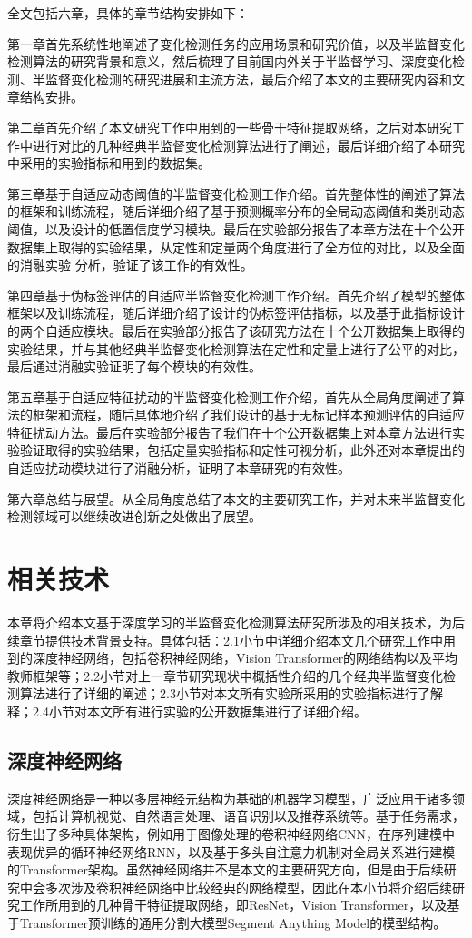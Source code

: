 \documentclass[lang=chs, degree=master, blindreview=false, adobe=false]{yanputhesis}
\begin{document}
全文包括六章，具体的章节结构安排如下：

第一章首先系统性地阐述了变化检测任务的应用场景和研究价值，以及半监督变化检测算法的研究背景和意义，然后梳理了目前国内外关于半监督学习、深度变化检测、半监督变化检测的研究进展和主流方法，最后介绍了本文的主要研究内容和文章结构安排。

第二章首先介绍了本文研究工作中用到的一些骨干特征提取网络，之后对本研究工作中进行对比的几种经典半监督变化检测算法进行了阐述，最后详细介绍了本研究中采用的实验指标和用到的数据集。

第三章基于自适应动态阈值的半监督变化检测工作介绍。首先整体性的阐述了算法的框架和训练流程，随后详细介绍了基于预测概率分布的全局动态阈值和类别动态阈值，以及设计的低置信度学习模块。最后在实验部分报告了本章方法在十个公开数据集上取得的实验结果，从定性和定量两个角度进行了全方位的对比，以及全面的消融实验
分析，验证了该工作的有效性。

第四章基于伪标签评估的自适应半监督变化检测工作介绍。首先介绍了模型的整体框架以及训练流程，随后详细介绍了设计的伪标签评估指标，以及基于此指标设计的两个自适应模块。最后在实验部分报告了该研究方法在十个公开数据集上取得的实验结果，并与其他经典半监督变化检测算法在定性和定量上进行了公平的对比，最后通过消融实验证明了每个模块的有效性。

第五章基于自适应特征扰动的半监督变化检测工作介绍，首先从全局角度阐述了算法的框架和流程，随后具体地介绍了我们设计的基于无标记样本预测评估的自适应特征扰动方法。最后在实验部分报告了我们在十个公开数据集上对本章方法进行实验验证取得的实验结果，包括定量实验指标和定性可视分析，此外还对本章提出的自适应扰动模块进行了消融分析，证明了本章研究的有效性。

第六章总结与展望。从全局角度总结了本文的主要研究工作，并对未来半监督变化检测领域可以继续改进创新之处做出了展望。
\chapter{相关技术}

本章将介绍本文基于深度学习的半监督变化检测算法研究所涉及的相关技术，为后续章节提供技术背景支持。具体包括：2.1小节中详细介绍本文几个研究工作中用到的深度神经网络，包括卷积神经网络，Vision Transformer的网络结构以及平均教师框架等；2.2小节对上一章节研究现状中概括性介绍的几个经典半监督变化检测算法进行了详细的阐述；2.3小节对本文所有实验所采用的实验指标进行了解释；2.4小节对本文所有进行实验的公开数据集进行了详细介绍。

\section{深度神经网络}
深度神经网络是一种以多层神经元结构为基础的机器学习模型，广泛应用于诸多领域，包括计算机视觉、自然语言处理、语音识别以及推荐系统等。基于任务需求，衍生出了多种具体架构，例如用于图像处理的卷积神经网络CNN，在序列建模中表现优异的循环神经网络RNN，以及基于多头自注意力机制对全局关系进行建模的Transformer架构。虽然神经网络并不是本文的主要研究方向，但是由于后续研究中会多次涉及卷积神经网络中比较经典的网络模型，因此在本小节将介绍后续研究工作所用到的几种骨干特征提取网络，即ResNet，Vision Transformer，以及基于Transformer预训练的通用分割大模型Segment Anything Model的模型结构。
\end{document}
